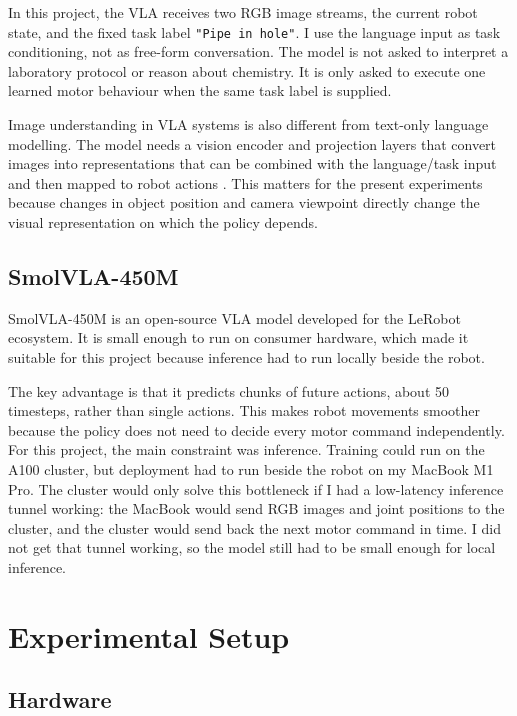 \documentclass[11pt, a4paper]{article}
\begin{document}
In this project, the VLA receives two RGB image streams, the current robot state, and the fixed task label \texttt{"Pipe in hole"}. I use the language input as task conditioning, not as free-form conversation. The model is not asked to interpret a laboratory protocol or reason about chemistry. It is only asked to execute one learned motor behaviour when the same task label is supplied.

Image understanding in VLA systems is also different from text-only language modelling. The model needs a vision encoder and projection layers that convert images into representations that can be combined with the language/task input and then mapped to robot actions \parencite{shukor2025smolvla, zitkovich2023rt2}. This matters for the present experiments because changes in object position and camera viewpoint directly change the visual representation on which the policy depends.

\subsection{SmolVLA-450M}
\label{sec:smolvla}

SmolVLA-450M \parencite{shukor2025smolvla} is an open-source VLA model developed for the LeRobot ecosystem. It is small enough to run on consumer hardware, which made it suitable for this project because inference had to run locally beside the robot.

The key advantage is that it predicts chunks of future actions, about 50 timesteps, rather than single actions. This makes robot movements smoother because the policy does not need to decide every motor command independently. For this project, the main constraint was inference. Training could run on the A100 cluster, but deployment had to run beside the robot on my MacBook M1 Pro. The cluster would only solve this bottleneck if I had a low-latency inference tunnel working: the MacBook would send RGB images and joint positions to the cluster, and the cluster would send back the next motor command in time. I did not get that tunnel working, so the model still had to be small enough for local inference.

\section{Experimental Setup}
\label{sec:setup}

\subsection{Hardware}
\end{document}
